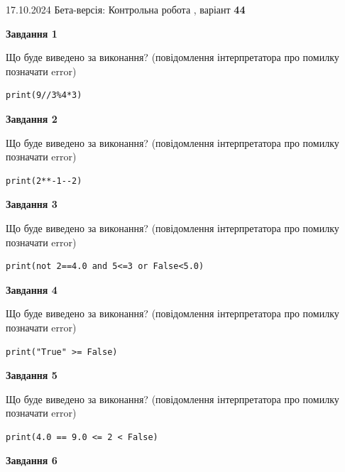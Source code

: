\documentclass[12pt, ukrainian]{article}
\begin{document}
{\Large{17.10.2024 Бета-версія: Контрольна робота , варіант  \No \textbf { 44 }\par}}
{
\begin {large}
{\begin {center}\textbf{Завдання 1}\end {center}}

Що буде виведено за виконання? (повідомлення інтерпретатора про помилку позначати error)\par
\begin{verbatim}
print(9//3%4*3)
\end{verbatim}

{\begin {center}\textbf{Завдання 2}\end {center}}

Що буде виведено за виконання? (повідомлення інтерпретатора про помилку позначати error)\par
\begin{verbatim}
print(2**-1--2)
\end{verbatim}

{\begin {center}\textbf{Завдання 3}\end {center}}

Що буде виведено за виконання? (повідомлення інтерпретатора про помилку позначати error)\par
\begin{verbatim}
print(not 2==4.0 and 5<=3 or False<5.0)
\end{verbatim}

{\begin {center}\textbf{Завдання 4}\end {center}}

Що буде виведено за виконання? (повідомлення інтерпретатора про помилку позначати error)\par
\begin{verbatim}
print("True" >= False)
\end{verbatim}

{\begin {center}\textbf{Завдання 5}\end {center}}

Що буде виведено за виконання? (повідомлення інтерпретатора про помилку позначати error)\par
\begin{verbatim}
print(4.0 == 9.0 <= 2 < False)
\end{verbatim}

{\begin {center}\textbf{Завдання 6}\end {center}}


\end{large}}
\end{document}
